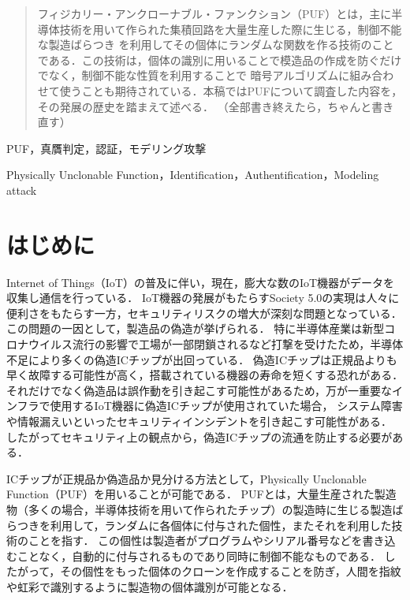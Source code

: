 \documentclass[technicalreport]{ieicej} %
\begin{document}
\begin{abstract}
  フィジカリー・アンクローナブル・ファンクション（PUF）とは，主に半導体技術を用いて作られた集積回路を大量生産した際に生じる，制御不能な製造ばらつき
  を利用してその個体にランダムな関数を作る技術のことである．この技術は，個体の識別に用いることで模造品の作成を防ぐだけでなく，制御不能な性質を利用することで
  暗号アルゴリズムに組み合わせて使うことも期待されている．本稿ではPUFについて調査した内容を，その発展の歴史を踏まえて述べる．
  （全部書き終えたら，ちゃんと書き直す）
\end{abstract}
\begin{keyword}
  PUF，真贋判定，認証，モデリング攻撃
\end{keyword}
\begin{eabstract}
\end{eabstract}
\begin{ekeyword}
  Physically Unclonable Function，Identification，Authentification，Modeling attack
\end{ekeyword}
\maketitle

\section{はじめに}
Internet of Things（IoT）の普及に伴い，現在，膨大な数のIoT機器がデータを収集し通信を行っている．
IoT機器の発展がもたらすSociety 5.0の実現は人々に便利さをもたらす一方，セキュリティリスクの増大が深刻な問題となっている．
この問題の一因として，製造品の偽造が挙げられる．
特に半導体産業は新型コロナウイルス流行の影響で工場が一部閉鎖されるなど打撃を受けたため，半導体不足により多くの偽造ICチップが出回っている\cite{ICfake}．
偽造ICチップは正規品よりも早く故障する可能性が高く，搭載されている機器の寿命を短くする恐れがある．
それだけでなく偽造品は誤作動を引き起こす可能性があるため，万が一重要なインフラで使用するIoT機器に偽造ICチップが使用されていた場合，
システム障害や情報漏えいといったセキュリティインシデントを引き起こす可能性がある．
したがってセキュリティ上の観点から，偽造ICチップの流通を防止する必要がある．

ICチップが正規品か偽造品か見分ける方法として，Physically Unclonable Function（PUF）を用いることが可能である．
PUFとは，大量生産された製造物（多くの場合，半導体技術を用いて作られたチップ）の製造時に生じる製造ばらつきを利用して，ランダムに各個体に付与された個性，またそれを利用した技術のことを指す．
この個性は製造者がプログラムやシリアル番号などを書き込むことなく，自動的に付与されるものであり同時に制御不能なものである．
したがって，その個性をもった個体のクローンを作成することを防ぎ，人間を指紋や虹彩で識別するように製造物の個体識別が可能となる．
\end{document}

